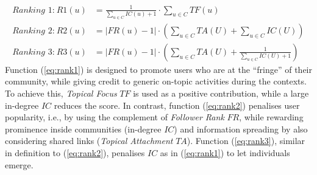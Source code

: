 \begin{align}
\textit{Ranking 1:} ~ \mathit{R1}(u) & = \frac{1}{\sum_{u \in C} \mathit{IC}(u) + 1} \cdot \sum_{u \in C} \mathit{TF}(u) \label{eq:rank1} \\
\textit{Ranking 2:} ~ \mathit{R2}(u) & = \lvert \mathit{FR}(u) - 1 \rvert \cdot \left(\sum_{u \in C} \mathit{TA}(U) + \sum_{u \in C} \mathit{IC}(U)\right) \label{eq:rank2} \\
\textit{Ranking 3:} ~ \mathit{R3}(u) & = \lvert \mathit{FR}(u) - 1 \rvert \cdot \left(\sum_{u \in C} \mathit{TA}(U) + \frac{1}{\sum_{u \in C} \mathit{IC}(U) + 1}\right) \label{eq:rank3}
\end{align}
%
Function (\ref{eq:rank1}) is designed to promote users who are at the ``fringe'' of their community, while giving credit to generic on-topic activities during the contexts. 
To achieve this, \textit{Topical Focus} $\mathit{TF}$ is used as a positive contribution, while a large in-degree $\mathit{IC}$ reduces the score.
%
In contrast, function (\ref{eq:rank2}) penalises user popularity, i.e., by using the complement of \textit{Follower Rank} $\mathit{FR}$, while rewarding prominence inside communities (in-degree $\mathit{IC}$) and information spreading by also considering shared links (\textit{Topical Attachment} $\mathit{TA}$).
%
Function (\ref{eq:rank3}), similar in definition to (\ref{eq:rank2}), penalises $\mathit{IC}$ as in (\ref{eq:rank1}) to let individuals emerge.


